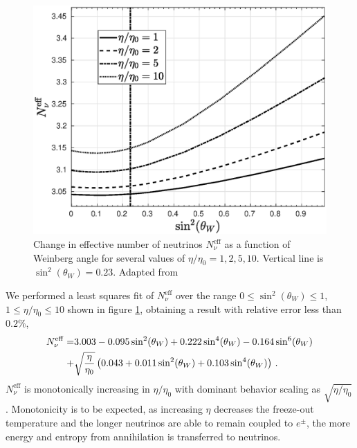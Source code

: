 \begin{figure}
\centerline{\includegraphics[width=0.90\columnwidth]{04-birrell/ParametricStudies/Figures/N_eff2.eps}}
\caption{Change in effective number of neutrinos  $N_\nu^{\mathrm{eff}}$ as a function of Weinberg angle for  several values of $\eta/\eta_0=1,2,5,10$. Vertical line is $\sin^2(\theta_W)=0.23$. Adapted from \cite{Birrell:2014uka}}
\label{N_nu_params}  
 \end{figure}

We performed a least squares fit of $N_\nu^{\mathrm{eff}}$ over the range $0\leq \sin^2(\theta_W)\leq 1$, $1\leq \eta/\eta_0\leq 10$ shown in figure \ref{N_nu_params}, obtaining a result with relative error less than $0.2\%$,
\begin{align}
N_\nu^{\mathrm{eff}}=&3.003-0.095\sin^2(\theta_W) +0.222\sin^4(\theta_W ) -0.164\sin^6(\theta_W )\notag\\
+&\sqrt{\frac{\eta}{\eta_0}}\left(0.043+0.011\sin^2(\theta_W) +0.103\sin^4(\theta_W)\right)\,.
\end{align}
$N_\nu^{\mathrm{eff}}$ is monotonically increasing in $\eta/\eta_0$ with dominant behavior  scaling as $\sqrt{ \eta/\eta_0}$. Monotonicity is to be expected, as increasing $\eta$ decreases the freeze-out temperature and the longer neutrinos are able to remain coupled to $e^\pm$, the more energy and entropy from annihilation is transferred to neutrinos.

